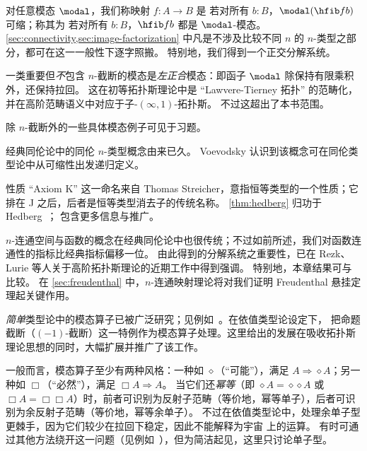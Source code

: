 对任意模态 $\modal$，我们称映射 $f:A\to B$ 是
%
%
若对所有 $b:B$，$\modal(\hfib f b)$ 可缩；称其为
%
%
若对所有 $b:B$，$\hfib f b$ 都是 $\modal$-模态。
\cref{sec:connectivity,sec:image-factorization} 中凡是不涉及比较不同 $n$ 的 $n$-类型之部分，都可在这一一般性下逐字照搬。
%
%
特别地，我们得到一个正交分解系统。

一类重要但\emph{不}包含 $n$-截断的模态是\emph{左正合}模态：即函子 $\modal$ 除保持有限乘积外，还保持拉回。
%
这在初等拓扑斯理论中是 ``Lawvere-Tierney 拓扑'' 的范畴化，
并在高阶范畴语义中对应于子-$(\infty,1)$-拓扑斯。
%
不过这超出了本书范围。

除 $n$-截断外的一些具体模态例子可见于习题。


\sectionNotes

经典同伦论中的同伦 $n$-类型概念由来已久。
Voevodsky 认识到该概念可在同伦类型论中从可缩性出发递归定义。

%
性质 ``Axiom K'' 这一命名来自 Thomas Streicher，意指恒等类型的一个性质；它排在 J 之后，后者是恒等类型消去子的传统名称。
\cref{thm:hedberg} 归功于 Hedberg~\cite{hedberg1998coherence}；\cite{krausgeneralizations} 包含更多信息与推广。

$n$-连通空间与函数的概念在经典同伦论中也很传统；不过如前所述，我们对函数连通性的指标比经典指标偏移一位。
由此得到的分解系统之重要性，已在 Rezk、Lurie 等人关于高阶拓扑斯理论的近期工作中得到强调。%
特别地，本章结果可与~\cite[\S6.5.1]{lurie:higher-topoi} 比较。
在 \cref{sec:freudenthal} 中，$n$-连通映射理论将对我们证明 Freudenthal 悬挂定理起关键作用。

\emph{简单}类型论中的模态算子已被广泛研究；见例如~\cite{modalTT}。在依值类型论设定下，\cite{ab:bracket-types} 把命题截断（$(-1)$-截断）这一特例作为模态算子处理。这里给出的发展在吸收拓扑斯理论思想的同时，大幅扩展并推广了该工作。

一般而言，模态算子至少有两种风格：一种如 $\diamond$（“可能”），满足 $A\Rightarrow \diamond A$；另一种如 $\Box$（“必然”），满足 $\Box A \Rightarrow A$。
当它们还\emph{幂等}（即 $\diamond A = \diamond{\diamond A}$ 或 $\Box A = \Box{\Box A}$）时，前者可识别为反射子范畴（等价地，幂等单子），后者可识别为余反射子范畴（等价地，幂等余单子）。
不过在依值类型论中，处理余单子型更棘手，因为它们较少在拉回下稳定，因此不能解释为宇宙 \UU 上的运算。
有时可通过其他方法绕开这一问题（见例如~\cite{QGFTinCHoTT12}），但为简洁起见，这里只讨论单子型。

